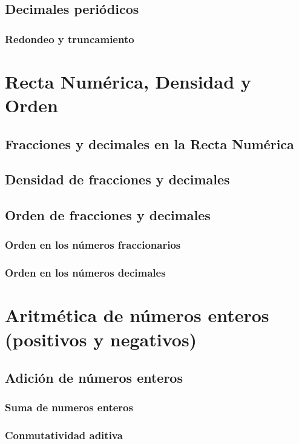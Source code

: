 \documentclass[12pt]{book}
\begin{document}
\begin{mainmatter}
    \subsection{Decimales peri\'odicos}
    \subsubsection{Redondeo y truncamiento}



    \section{Recta Num\'erica, Densidad y Orden}
    \subsection{Fracciones y decimales en la Recta Num\'erica}
    \subsection{Densidad de fracciones y decimales}
    \subsection{Orden de fracciones y decimales}
    \subsubsection{Orden en los n\'umeros fraccionarios}
    \subsubsection{Orden en los n\'umeros decimales}

    \section{Aritmética de números enteros (positivos y negativos)}

    \subsection{Adición de n\'umeros enteros}
    \subsubsection{Suma de numeros enteros}
    \subsubsection{Conmutatividad aditiva}

\end{mainmatter}
\end{document}
